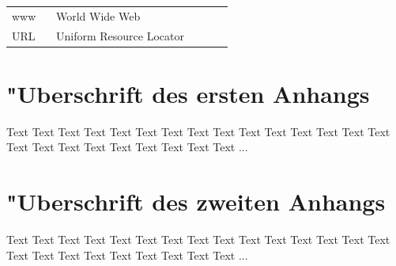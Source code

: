 \documentclass[a4paper,bibtotoc,oneside]{scrbook}
\begin{document}
\hspace{-17mm}\begin{tabular}{>{\raggedleft}p{0.2\linewidth} p{0.75\linewidth} p{0.1\linewidth}}
www & World Wide Web \\
URL & Uniform Resource Locator
\end{tabular}


\begin{appendix}
\chapter[Erster Anhang]{"Uberschrift des ersten Anhangs}

Text Text Text Text Text Text Text Text Text Text Text Text Text Text Text Text Text Text Text Text Text Text Text Text ...
 

\chapter[Zweiter Anhang]{"Uberschrift des zweiten Anhangs}

Text Text Text Text Text Text Text Text Text Text Text Text Text Text Text Text Text Text Text Text Text Text Text Text ...

\end{appendix}
\end{document}
